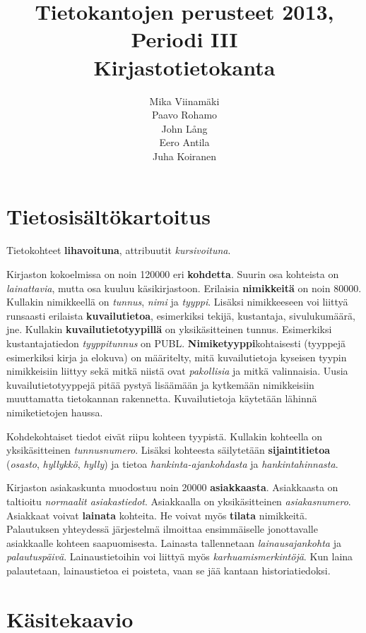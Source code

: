 \documentclass{article}
\title{Tietokantojen perusteet 2013, Periodi III \\ Kirjastotietokanta}
\author{Mika Viinamäki \\ Paavo Rohamo \\ John Lång \\ Eero Antila \\ Juha Koiranen}
\begin{document}
\maketitle 

\section{Tietosisältökartoitus}

Tietokohteet \textbf{lihavoituna}, attribuutit \textit{kursivoituna}.

Kirjaston kokoelmissa on noin 120000 eri \textbf{kohdetta}. Suurin osa kohteista on \textit{lainattavia}, mutta osa kuuluu käsikirjastoon. Erilaisia \textbf{nimikkeitä} on noin 80000. Kullakin nimikkeellä on \textit{tunnus}, \textit{nimi} ja \textit{tyyppi}. Lisäksi nimikkeeseen voi liittyä runsaasti erilaista \textbf{kuvailutietoa}, esimerkiksi tekijä, kustantaja, sivulukumäärä, jne. Kullakin \textbf{kuvailutietotyypillä} on yksikäsitteinen tunnus. Esimerkiksi kustantajatiedon \textit{tyyppitunnus} on PUBL. \textbf{Nimiketyyppi}kohtaisesti (tyyppejä esimerkiksi kirja ja elokuva) on määritelty, mitä kuvailutietoja kyseisen tyypin nimikkeisiin liittyy sekä mitkä niistä ovat \textit{pakollisia} ja mitkä valinnaisia. Uusia kuvailutietotyyppejä pitää pystyä lisäämään ja kytkemään nimikkeisiin muuttamatta tietokannan rakennetta. Kuvailutietoja käytetään lähinnä nimiketietojen haussa.

Kohdekohtaiset tiedot eivät riipu kohteen tyypistä. Kullakin kohteella on yksikäsitteinen \textit{tunnusnumero}. Lisäksi kohteesta säilytetään \textbf{sijaintitietoa} (\textit{osasto}, \textit{hyllykkö}, \textit{hylly}) ja tietoa \textit{hankinta-ajankohdasta} ja \textit{hankintahinnasta}.

Kirjaston asiakaskunta muodostuu noin 20000 \textbf{asiakkaasta}. Asiakkaasta on taltioitu \emph{normaalit asiakastiedot}. Asiakkaalla on yksikäsitteinen \emph{asiakasnumero}. Asiakkaat voivat \textbf{lainata} kohteita. He voivat myös \textbf{tilata} nimikkeitä. Palautuksen yhteydessä järjestelmä ilmoittaa ensimmäiselle jonottavalle asiakkaalle kohteen saapuomisesta. Lainasta tallennetaan \emph{lainausajankohta} ja \emph{palautuspäivä}. Lainaustietoihin voi liittyä myös \emph{karhuamismerkintöjä}. Kun laina palautetaan, lainaustietoa ei poisteta, vaan se jää kantaan historiatiedoksi. 

\section{Käsitekaavio}
\end{document}
